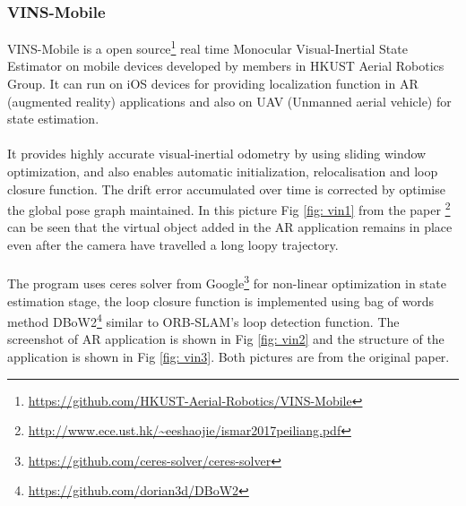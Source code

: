 \documentclass[12pt,twoside]{article}
\begin{document}
\subsubsection{VINS-Mobile}
VINS-Mobile\citep{yang2017monocular} is a open source\footnote{\url{https://github.com/HKUST-Aerial-Robotics/VINS-Mobile}} real time Monocular Visual-Inertial State Estimator on mobile devices developed by members in HKUST Aerial Robotics Group. It can run on iOS devices for providing localization function in AR (augmented reality) applications and also on UAV (Unmanned aerial vehicle) for state estimation.\\
\\
It provides highly accurate visual-inertial odometry by using sliding window optimization, and also enables automatic initialization, relocalisation and loop closure function. The drift error accumulated over time is corrected by optimise the global pose graph maintained. In this picture Fig \ref{fig: vin1} from the paper \footnote{\url{http://www.ece.ust.hk/~eeshaojie/ismar2017peiliang.pdf}} can be seen that the virtual object added in the AR application remains in place even after the camera have travelled a long loopy trajectory.\\
\\
The program uses ceres solver\citep{ceres-solver} from Google\footnote{\url{https://github.com/ceres-solver/ceres-solver}} for non-linear optimization in state estimation stage, the loop closure function is implemented using bag of words method DBoW2\footnote{\url{https://github.com/dorian3d/DBoW2}} similar to ORB-SLAM's loop detection function. The screenshot of AR application is shown in Fig \ref{fig: vin2} and the structure of the application is shown in Fig \ref{fig: vin3}. Both pictures are from the original paper.\\
\end{document}
